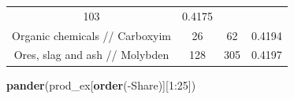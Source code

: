 \documentclass[10pt,]{article}
\newenvironment{Shaded}{\begin{snugshade}}{\end{snugshade}}
\newcommand{\KeywordTok}[1]{\textcolor[rgb]{0.13,0.29,0.53}{\textbf{{#1}}}}
\newcommand{\DecValTok}[1]{\textcolor[rgb]{0.00,0.00,0.81}{{#1}}}
\newcommand{\NormalTok}[1]{{#1}}
\begin{document}
\begin{longtable}[]{@{}cccc@{}}
\begin{minipage}[t]{0.20\columnwidth}
103\strut
\end{minipage} & \begin{minipage}[t]{0.09\columnwidth}\centering\strut
0.4175\strut
\end{minipage}\tabularnewline
\begin{minipage}[t]{0.38\columnwidth}\centering\strut
Organic chemicals // Carboxyim\strut
\end{minipage} & \begin{minipage}[t]{0.21\columnwidth}\centering\strut
26\strut
\end{minipage} & \begin{minipage}[t]{0.20\columnwidth}\centering\strut
62\strut
\end{minipage} & \begin{minipage}[t]{0.09\columnwidth}\centering\strut
0.4194\strut
\end{minipage}\tabularnewline
\begin{minipage}[t]{0.38\columnwidth}\centering\strut
Ores, slag and ash // Molybden\strut
\end{minipage} & \begin{minipage}[t]{0.21\columnwidth}\centering\strut
128\strut
\end{minipage} & \begin{minipage}[t]{0.20\columnwidth}\centering\strut
305\strut
\end{minipage} & \begin{minipage}[t]{0.09\columnwidth}\centering\strut
0.4197\strut
\end{minipage}\tabularnewline
\bottomrule
\end{longtable}

\begin{Shaded}
\begin{Highlighting}[]
\KeywordTok{pander}\NormalTok{(prod_ex[}\KeywordTok{order}\NormalTok{(-Share)][}\DecValTok{1}\NormalTok{:}\DecValTok{25}\NormalTok{])}
\end{Highlighting}
\end{Shaded}
\end{document}
